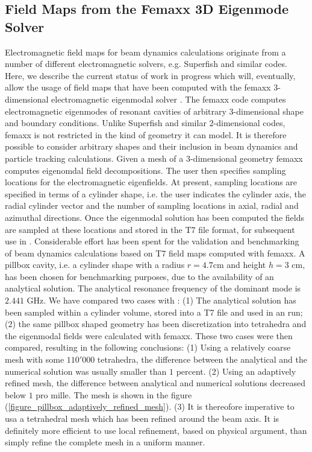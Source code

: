 \subsection{Field Maps from the Femaxx 3D Eigenmode Solver}

Electromagnetic field maps for beam dynamics calculations originate from a number of different
electromagnetic solvers, e.g. Superfish and similar codes.
Here, we describe the current status of work in progress which will, eventually,
allow the usage of field maps that have been computed with the femaxx $3$-dimensional
electromagnetic eigenmodal solver \cite{bib:arbenzetal2001,bib:arbenzetal2006}.
The femaxx code computes electromagnetic eigenmodes of resonant cavities of
arbitrary $3$-dimensional shape and boundary conditions.
Unlike Superfish and similar $2$-dimensional codes, femaxx is not restricted in the
kind of geometry it can model. It is therefore possible to consider arbitrary
shapes and their inclusion in beam dynamics and particle tracking calculations.
Given a mesh of a $3$-dimensional geometry femaxx computes eigenomdal field
decompositions.
The user then specifies sampling locations for the electromagnetic eigenfields.
At present, sampling locations are specified in terms of a cylinder shape,
i.e. the user indicates the cylinder axis, the radial cylinder vector and 
the number of sampling locations in axial, radial and azimuthal directions.
Once the eigenmodal solution has been computed the fields are sampled at
these locations and stored in the T7 file format, for subsequent use in \opal.
Considerable effort has been spent for the validation and benchmarking of
beam dynamics calculations based on T7 field maps computed with femaxx.
A pillbox cavity, i.e. a cylinder shape with a radius $r = 4.7$cm and
height $h = 3$ cm, has been chosen for benchmarking purposes,
due to the availability of an analytical solution.
The analytical resonance frequency of the dominant mode is $2.441$ GHz.
We have compared two cases with \opal: (1) The analytical solution has been
sampled within a cylinder volume, stored into a T7 file and used in an \opal
run; (2) the same pillbox shaped geometry has been discretization into tetrahedra
and the eigenmodal fields were calculated with femaxx.
These two cases were then compared, resulting in the following conclusions:
(1) Using a relatively coarse mesh with some $110'000$ tetrahedra, the difference
between the analytical and the numerical solution was usually smaller than
$1$ percent.
(2) Using an adaptively refined mesh, the difference between analytical and
numerical solutions decreased below $1$ pro mille. The mesh is shown
in the figure (\ref{figure_pillbox_adaptively_refined_mesh}).
(3) It is thereofore imperative to usa a tetrahedral mesh which has been
refined around the beam axis. It is definitely more efficient to use local
refinement, based on physical argument, than simply refine the complete
mesh in a uniform manner.


